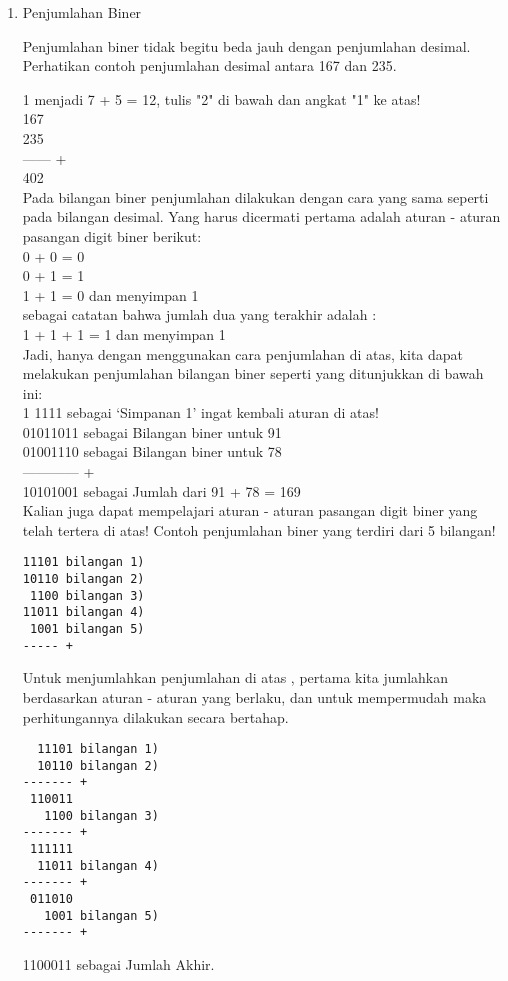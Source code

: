 \begin{enumerate}[label=(\alph*)]
\begin{enumerate}

\item Penjumlahan Biner

\qquad Penjumlahan biner tidak begitu beda jauh dengan penjumlahan desimal. Perhatikan contoh penjumlahan desimal antara 167 dan 235.

1 menjadi 7 + 5 = 12, tulis "2" di bawah dan angkat "1" ke atas! \\

167 \\
235 \\
------ + \\
402 \\

\qquad Pada bilangan biner penjumlahan dilakukan dengan cara yang sama seperti pada bilangan desimal. Yang harus dicermati pertama adalah aturan - aturan pasangan digit biner berikut:\\
0 + 0 = 0 \\
0 + 1 = 1 \\
1 + 1 = 0  dan menyimpan 1 \\

sebagai catatan bahwa jumlah dua yang terakhir adalah : \\
1 + 1 + 1 = 1 dan menyimpan 1 \\

\qquad Jadi, hanya dengan menggunakan cara penjumlahan di atas, kita dapat melakukan penjumlahan bilangan biner seperti yang ditunjukkan di bawah ini: \\
1 1111 sebagai `Simpanan 1' ingat kembali aturan di atas! \\
01011011 sebagai Bilangan biner untuk 91 \\
01001110 sebagai Bilangan biner untuk 78 \\
------------ + \\
10101001 sebagai Jumlah dari 91 + 78 = 169 \\

\qquad Kalian juga dapat mempelajari aturan - aturan pasangan digit biner yang telah tertera di atas! Contoh penjumlahan biner yang terdiri dari 5 bilangan!\\
\begin{verbatim}
11101 bilangan 1)
10110 bilangan 2)
 1100 bilangan 3)
11011 bilangan 4)
 1001 bilangan 5)
----- +
\end{verbatim}

\qquad Untuk menjumlahkan penjumlahan di atas , pertama kita jumlahkan berdasarkan aturan - aturan yang berlaku, dan untuk mempermudah maka perhitungannya dilakukan secara bertahap. \\
\begin{verbatim}
  11101 bilangan 1)
  10110 bilangan 2)
------- +
 110011
   1100 bilangan 3)
------- +
 111111
  11011 bilangan 4)
------- +
 011010
   1001 bilangan 5)
------- +
\end{verbatim}
1100011 sebagai Jumlah Akhir. \\


\end{enumerate}
\end{enumerate}
